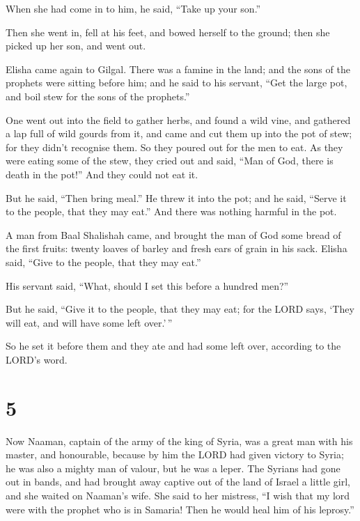 When she had come in to him, he said, ``Take up your son.''

 Then she went in, fell at his feet, and bowed herself to
the ground; then she picked up her son, and went out.

 Elisha came again to Gilgal. There was a famine in the
land; and the sons of the prophets were sitting before him; and he said
to his servant, ``Get the large pot, and boil stew for the sons of the
prophets.''

 One went out into the field to gather herbs, and found a
wild vine, and gathered a lap full of wild gourds from it, and came and
cut them up into the pot of stew; for they didn't recognise them.
 So they poured out for the men to eat. As they were eating
some of the stew, they cried out and said, ``Man of God, there is death
in the pot!'' And they could not eat it.

 But he said, ``Then bring meal.'' He threw it into the
pot; and he said, ``Serve it to the people, that they may eat.'' And
there was nothing harmful in the pot.

 A man from Baal Shalishah came, and brought the man of God
some bread of the first fruits: twenty loaves of barley and fresh ears
of grain in his sack. Elisha said, ``Give to the people, that they may
eat.''

 His servant said, ``What, should I set this before a
hundred men?''

But he said, ``Give it to the people, that they may eat; for the LORD
says, `They will eat, and will have some left over.'\,''

 So he set it before them and they ate and had some left
over, according to the LORD's word.

\hypertarget{section-4}{%
\section{5}\label{section-4}}

 Now Naaman, captain of the army of the king of Syria, was a
great man with his master, and honourable, because by him the LORD had
given victory to Syria; he was also a mighty man of valour, but he was a
leper.  The Syrians had gone out in bands, and had brought
away captive out of the land of Israel a little girl, and she waited on
Naaman's wife.  She said to her mistress, ``I wish that my
lord were with the prophet who is in Samaria! Then he would heal him of
his leprosy.''

